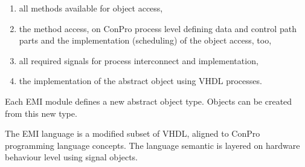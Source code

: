 \documentclass[a4paper,12pt,twoside,english]{article}
\begin{document}
\vskip5pt

\begin{enumerate}
\item all methods available for object access,

\item the method access, on ConPro process level defining data and control path parts and the implementation (scheduling) of the object access, too,

\item all required signals for process interconnect and implementation,

\item the implementation of the abstract object using VHDL processes.


\end{enumerate}

\vskip5pt
Each EMI module defines a new abstract object type. Objects can be created from this new type. 


\vskip5pt
The EMI language is a modified subset of VHDL, aligned to ConPro programming language concepts. The language semantic is layered on  hardware behaviour level
using signal objects.


\vskip5pt



\vskip5pt

\def\thesubsubsection{\vrule width 0pt height 1.3 ex}
\end{document}
